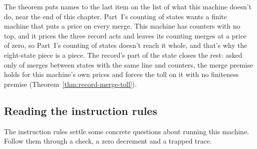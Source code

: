 \documentclass[11pt,twoside]{article}
\theoremstyle{thielethm}
\theoremstyle{thieledef}
\theoremstyle{thieledef}
\theoremstyle{thieledef}
\theoremstyle{thielethm}
\theoremstyle{thieleobs}
\theoremstyle{thielethm}
\begin{document}
The theorem puts names to the last item on the list of what this machine doesn't do, near the end
of this chapter. Part~I's counting of states wants a finite machine that puts a price on every merge. This
machine has counters with no top, and it prices the three record acts and leaves its counting
merges at a price of zero, so Part~I's counting of states doesn't reach it whole, and that's why the eight-state piece
is a piece. The record's part of the state closes the rest: asked only of merges between states with the same
line and counters, the merge premise holds for this machine's own prices and forces the toll on
it with no finiteness premise (Theorem~\ref{thm:record-merge-toll}).

\subsection{Reading the instruction rules}

The instruction rules settle some concrete questions about running this machine. Follow
them through a check, a zero decrement and a trapped trace.
\end{document}
